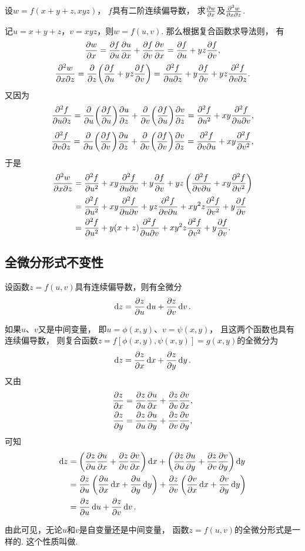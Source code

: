\begin{example}
设\(w = f(x+y+z,xyz)\)，
\(f\)具有二阶连续偏导数，
求\(\pdv{w}{x}\)及\(\pdv[2]{w}{x}{z}\).
\begin{solution}
记\(u = x+y+z\)，\(v = xyz\)，则\(w = f(u,v)\).
那么根据复合函数求导法则，
有\[
	\pdv{w}{x} = \pdv{f}{u} \pdv{u}{x} + \pdv{f}{v} \pdv{v}{x}
	= \pdv{f}{u} + yz \pdv{f}{v},
\]\[
	\pdv[2]{w}{x}{z} = \pdv{z}(\pdv{f}{u} + yz \pdv{f}{v})
	= \pdv[2]{f}{u}{z} + y\pdv{f}{v} + yz \pdv[2]{f}{v}{z}.
\]
又因为\[
	\pdv[2]{f}{u}{z}
	= \pdv{u}(\pdv{f}{u}) \pdv{u}{z} + \pdv{v}(\pdv{f}{u}) \pdv{v}{z}
	= \pdv[2]{f}{u} + xy \pdv[2]{f}{u}{v},
\]\[
	\pdv[2]{f}{v}{z}
	= \pdv{u}(\pdv{f}{v}) \pdv{u}{z} + \pdv{v}(\pdv{f}{v}) \pdv{v}{z}
	= \pdv[2]{f}{v}{u} + xy \pdv[2]{f}{v},
\]
于是\begin{align*}
	\pdv[2]{w}{x}{z}
	&= \pdv[2]{f}{u} + xy \pdv[2]{f}{u}{v}
	+ y\pdv{f}{v} + yz \left( \pdv[2]{f}{v}{u} + xy \pdv[2]{f}{v} \right) \\
	&= \pdv[2]{f}{u}
	+ xy \pdv[2]{f}{u}{v} + yz \pdv[2]{f}{v}{u}
	+ x y^2 z \pdv[2]{f}{v}
	+ y \pdv{f}{v} \\
	&= \pdv[2]{f}{u}
	+ y(x+z) \pdv[2]{f}{u}{v}
	+ x y^2 z \pdv[2]{f}{v}
	+ y \pdv{f}{v}.
\end{align*}
\end{solution}
\end{example}

\subsection{全微分形式不变性}
\begin{theorem}[全微分形式不变性]
设函数\(z=f(u,v)\)具有连续偏导数，则有全微分\[
	\dd{z}=\pdv{z}{u}\dd{u}+\pdv{z}{v}\dd{v}.
\]

如果\(u\)、\(v\)又是中间变量，
即\(u=\phi(x,y)\)、\(v=\psi(x,y)\)，
且这两个函数也具有连续偏导数，
则复合函数\(z=f[\phi(x,y),\psi(x,y)]=g(x,y)\)的全微分为\[
	\dd{z}=\pdv{z}{x}\dd{x}+\pdv{z}{y}\dd{y}.
\]
又由\begin{gather*}
	\pdv{z}{x} = \pdv{z}{u}\pdv{u}{x} + \pdv{z}{v}\pdv{v}{x}, \\
	\pdv{z}{y} = \pdv{z}{u}\pdv{u}{y} + \pdv{z}{v}\pdv{v}{y},
\end{gather*}
可知\begin{align*}
	\dd{z}
	&=\left(\pdv{z}{u}\pdv{u}{x} + \pdv{z}{v}\pdv{v}{x}\right)\dd{x}
	+\left(\pdv{z}{u}\pdv{u}{y} + \pdv{z}{v}\pdv{v}{y}\right)\dd{y} \\
	&=\pdv{z}{u}\left(\pdv{u}{x}\dd{x}+\pdv{u}{y}\dd{y}\right)
	+\pdv{z}{v}\left(\pdv{v}{x}\dd{x}+\pdv{v}{y}\dd{y}\right) \\
	&=\pdv{z}{u}\dd{u}+\pdv{z}{v}\dd{v}.
\end{align*}
\end{theorem}
由此可见，无论\(u\)和\(v\)是自变量还是中间变量，
函数\(z=f(u,v)\)的全微分形式是一样的.
这个性质叫做.

